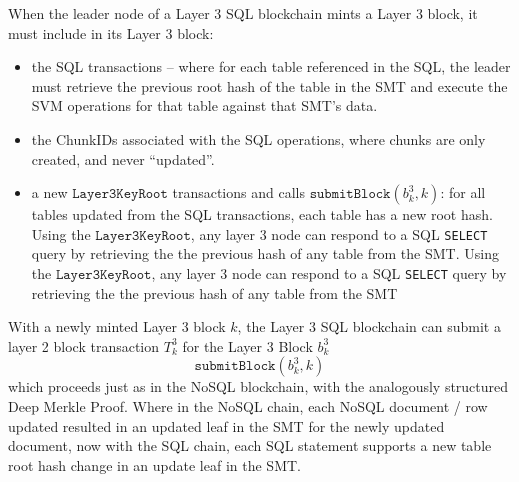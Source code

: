\documentclass{article}
\newcommand{\blockhash}[2]{b^{#1}_{#2}}
\newcommand{\transaction}[2]{T_{#2}^#1}
\newcommand{\submitblock}[2]{\texttt{submitBlock}(#2, #1)}
\newcommand{\sql}[1]{\texttt{#1}}
\begin{document}
When the leader node of a Layer 3 SQL blockchain mints a Layer 3 block, it must include in its Layer 3 block:
\begin{itemize}
\item the SQL transactions -- where for each table referenced in the SQL, the leader must retrieve the previous root hash of the table in the SMT and execute the SVM operations for that table against that SMT's data.

\item the ChunkIDs associated with the SQL operations, where chunks are only created, and never ``updated''.

\item a  new $\texttt{Layer3KeyRoot}$  transactions and calls $\submitblock{k}{\blockhash{3}{k}}$: for all tables updated from the SQL transactions, each table has a new root hash.
Using the $\texttt{Layer3KeyRoot}$, any layer 3 node can respond to a SQL \sql{SELECT} query by retrieving the the previous hash of any table from the SMT.
Using the $\texttt{Layer3KeyRoot}$, any layer 3 node can respond to a SQL \sql{SELECT} query by retrieving the the previous hash of any table from the SMT

\end{itemize}
With a newly minted Layer 3 block $k$, the Layer 3 SQL blockchain can submit a layer 2 block transaction $\transaction{3}{k}$ for the  Layer 3 Block $\blockhash{3}{k}$
\[
\submitblock{k}{\blockhash{3}{k}}
\]
which proceeds just as in the NoSQL blockchain, with the analogously structured Deep Merkle Proof.  Where in the NoSQL chain, each NoSQL document / row updated resulted in an updated leaf in the SMT for the newly updated document, now with the SQL chain, each SQL statement supports a new table root hash change in an update leaf in the SMT.
\end{document}
